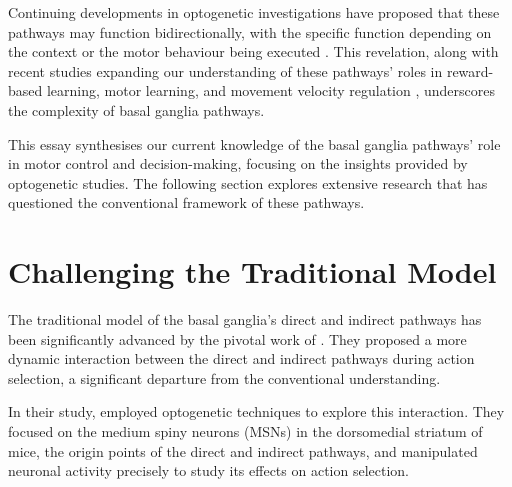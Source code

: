 \documentclass[10pt]{article}
\begin{document}
\begin{sloppypar}
  Continuing developments in optogenetic investigations have proposed that these pathways may function bidirectionally, with the specific function depending on the context or the motor behaviour being executed \citep{yttri_opponent_2016}. This revelation, along with recent studies expanding our understanding of these pathways’ roles in reward-based learning, motor learning, and movement velocity regulation \citep{hilt_evidence_2016, wang_direct_2015}, underscores the complexity of basal ganglia pathways.

  This essay synthesises our current knowledge of the basal ganglia pathways’ role in motor control and decision-making, focusing on the insights provided by optogenetic studies. The following section explores extensive research that has questioned the conventional framework of these pathways.

  \section{Challenging the Traditional Model}
  \label{sec:challenging-the-traditional-model}

  The traditional model of the basal ganglia’s direct and indirect pathways has been significantly advanced by the pivotal work of \cite{cui_concurrent_2013}. They proposed a more dynamic interaction between the direct and indirect pathways during action selection, a significant departure from the conventional understanding.

  In their study, \cite{cui_concurrent_2013} employed optogenetic techniques to explore this interaction. They focused on the medium spiny neurons (MSNs) in the dorsomedial striatum of mice, the origin points of the direct and indirect pathways, and manipulated neuronal activity precisely to study its effects on action selection.


\end{sloppypar}
\end{document}
